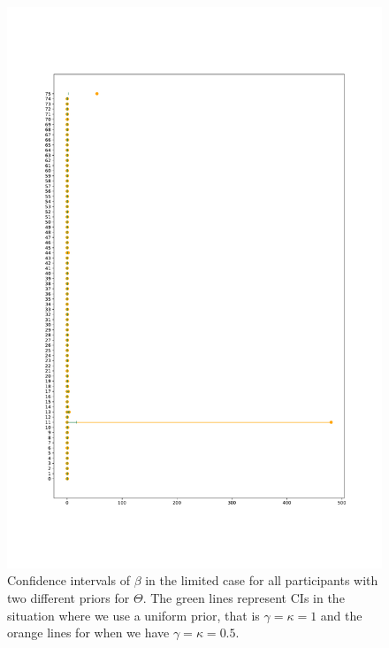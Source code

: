 \begin{figure}
    \centering
    \includegraphics[scale=0.37]{pictures/Sensitivity/ci_lim_beta_pdf.pdf}
    \caption[CIs for $\beta$ in the limited case]{Confidence intervals of $\beta$ in the limited case for all participants with two different priors for $\Theta$. The green lines represent CIs in the situation where we use a uniform prior, that is $\gamma=\kappa=1$ and the orange lines for when we have $\gamma=\kappa=0.5$.}
    \label{fig:sensitivity_ci_lim_beta}
\end{figure}

